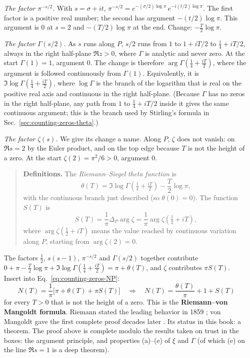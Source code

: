 \emph{The factor $\pi^{-s/2}$.} With $s=\sigma+it$, $\pi^{-s/2}=e^{-(\sigma/2)\log\pi}\,e^{-i(t/2)\log\pi}$. The first factor is a positive real number; the second has argument $-(t/2)\log\pi$. This argument is $0$ at $s=2$ and $-(T/2)\log\pi$ at the end. Change: $-\tfrac T2\log\pi$.

\emph{The factor $\Gamma(s/2)$.} As $s$ runs along $P$, $s/2$ runs from $1$ to $1+iT/2$ to $\tfrac14+iT/2$, always in the right half-plane $\Re z>0$, where $\Gamma$ is analytic and never zero. At the start $\Gamma(1)=1$, argument 0. The change is therefore $\arg\Gamma(\tfrac14+\tfrac{iT}2)$, where the argument is followed continuously from $\Gamma(1)$. Equivalently, it is $\Im\log\Gamma(\tfrac14+\tfrac{iT}{2})$, where $\log\Gamma$ is the branch of the logarithm that is real on the positive real axis and continuous in the right half-plane. (Because $\Gamma$ has no zeros in the right half-plane, any path from $1$ to $\tfrac14+iT/2$ inside it gives the same continuous argument; this is the branch used by Stirling's formula in Sec.~\ref{sec:counting-zeros-theta}.)

\emph{The factor $\zeta(s)$.} We give its change a name. Along $P$, $\zeta$ does not vanish: on $\Re s=2$ by the Euler product, and on the top edge because $T$ is not the height of a zero. At the start $\zeta(2)=\pi^2/6>0$, argument 0.

\begin{quote}
\textbf{Definitions.} The \emph{Riemann--Siegel theta function} is
\begin{equation}
\theta(T)=\Im\log\Gamma\!\left(\tfrac14+\tfrac{iT}{2}\right)-\frac T2\log\pi,
\label{eq:counting-zeros-thetadef}
\end{equation}
with the continuous branch just described (so $\theta(0)=0$). The function $S(T)$ is
\begin{equation}
S(T)=\frac1\pi\Delta_P\arg\zeta=\frac1\pi\arg\zeta\!\left(\tfrac12+iT\right),
\label{eq:counting-zeros-Sdef}
\end{equation}
where $\arg\zeta(\tfrac12+iT)$ means the value reached by continuous variation along $P$, starting from $\arg\zeta(2)=0$.
\end{quote}

The factors $\tfrac12$, $s(s-1)$, $\pi^{-s/2}$ and $\Gamma(s/2)$ together contribute $0+\pi-\tfrac T2\log\pi+\Im\log\Gamma(\tfrac14+\tfrac{iT}2)=\pi+\theta(T)$, and $\zeta$ contributes $\pi S(T)$. Insert into Eq.~\eqref{eq:counting-zeros-NP}:
\begin{equation}
N(T)=\frac1\pi\bigl[\pi+\theta(T)+\pi S(T)\bigr]
\quad\Longrightarrow\quad
\boxed{N(T)=\frac{\theta(T)}{\pi}+1+S(T)}
\label{eq:counting-zeros-RvM}
\end{equation}
for every $T>0$ that is not the height of a zero. This is the \textbf{Riemann--von Mangoldt formula}. Riemann stated the leading behavior in 1859 \cite{riemann1859}; von Mangoldt gave the first complete proof decades later \cite{edwards,titchmarsh}. Its status in this book: a theorem. The proof above is complete modulo the results taken on trust in the boxes: the argument principle, and properties (a)--(e) of $\xi$ and $\Gamma$ (of which (e) on the line $\Re s=1$ is a deep theorem).

